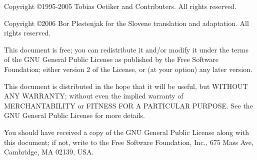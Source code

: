
\ifx\pdfoutput\undefined %
\else
{}
\fi
\newlength{\centeroffset}
\setlength{\centeroffset}{-0.5\oddsidemargin}
\addtolength{\centeroffset}{0.5\evensidemargin}
\thispagestyle{empty}
\noindent\hspace*{\centeroffset}

\noindent\hspace*{\centeroffset}



\pagebreak
\begin{small} 
  Copyright \copyright 1995-2005 Tobias Oetiker and Contributers.  All rights reserved.
 
  Copyright \copyright 2006 Bor Plestenjak for the Slovene translation and adaptation. 
  All rights reserved.

  This document is free; you can redistribute it and/or modify it
  under the terms of the GNU General Public License as published by
  the Free Software Foundation; either version 2 of the License, or
  (at your option) any later version.
  
  This document is distributed in the hope that it will be useful, but
  WITHOUT ANY WARRANTY; without even the implied warranty of
  MERCHANTABILITY or FITNESS FOR A PARTICULAR PURPOSE\@.  See the GNU
  General Public License for more details.
  
  You should have received a copy of the GNU General Public License
  along with this document; if not, write to the Free Software
  Foundation, Inc., 675 Mass Ave, Cambridge, MA 02139, USA.

\end{small}
\vspace{6ex}

